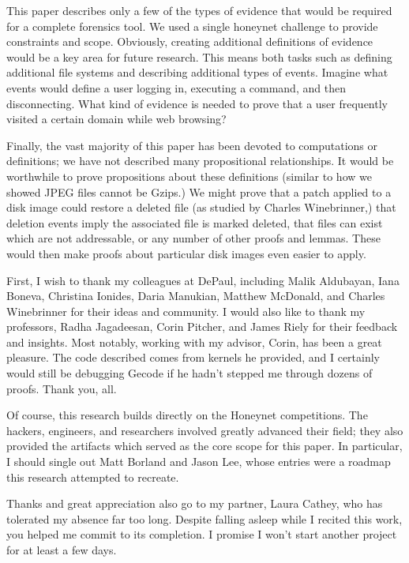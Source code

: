\documentclass[nocopyrightspace,preprint]{sigplanconf}
\begin{document}
This paper describes only a few of the types of evidence that would be
required for a complete forensics tool. We used a single honeynet challenge to
provide constraints and scope. Obviously, creating additional definitions of
evidence would be a key area for future research. This means both tasks such
as defining additional file systems and describing additional types of events.
Imagine what events would define a user logging in, executing a command, and
then disconnecting. What kind of evidence is needed to prove that a user
frequently visited a certain domain while web browsing?

Finally, the vast majority of this paper has been devoted to computations or
definitions; we have not described many propositional relationships. It would
be worthwhile to prove propositions about these definitions (similar to how we
showed JPEG files cannot be Gzips.) We might prove that a patch applied to a
disk image could restore a deleted file (as studied by Charles Winebrinner,)
that deletion events imply the associated file is marked deleted, that files
can exist which are not addressable, or any number of other proofs and lemmas.
These would then make proofs about particular disk images even easier to
apply. 

\acks
First, I wish to thank my colleagues at DePaul, including Malik Aldubayan,
Iana Boneva, Christina Ionides, Daria Manukian, Matthew McDonald, and Charles
Winebrinner for their ideas and community. I would also like to thank my
professors, Radha Jagadeesan, Corin Pitcher, and James Riely for their
feedback and insights. Most notably, working with my advisor, Corin, has been
a great pleasure. The code described comes from kernels he provided, and I
certainly would still be debugging Gecode if he hadn't stepped me through
dozens of proofs. Thank you, all.

Of course, this research builds directly on the Honeynet competitions. The
hackers, engineers, and researchers involved greatly advanced their field;
they also provided the artifacts which served as the core scope for this
paper. In particular, I should single out Matt Borland and Jason Lee, whose
entries were a roadmap this research attempted to recreate.

Thanks and great appreciation also go to my partner, Laura Cathey, who has
tolerated my absence far too long. Despite falling asleep while I recited this
work, you helped me commit to its completion. I promise I won't start another
project for at least a few days.
\end{document}
